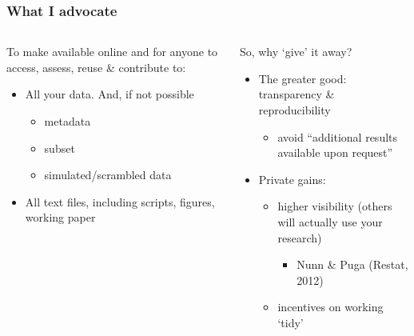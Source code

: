 \documentclass[ignorenonframetext]{beamer}
\begin{document}
\begin{frame}
  \frametitle{What I advocate}
  \begin{columns}
    \begin{column}{.5\textwidth}
      To make available online and for anyone to \alert{access}, \alert{assess}, \alert{reuse} \& \alert{contribute} to:
      \begin{itemize}
        \item All your \alert{data}. And, if not possible
          \begin{itemize}
            \item metadata
            \item subset
            \item simulated/scrambled data
          \end{itemize}
        \item All \alert{text} files, including scripts, figures, working paper\pause
        \end{itemize}
    \end{column}

    \begin{column}{.5\textwidth}
      So, why `give' it away?
      \begin{itemize}
        \item The greater good: \alert{transparency} \& \alert{reproducibility}
          \begin{itemize}
            \item avoid ``additional results available upon request''
          \end{itemize}
        \item \alert{Private} gains:
          \begin{itemize}
            \item higher visibility (others will actually use your research)
              \begin{itemize}
                \item Nunn \& Puga (Restat, 2012)
              \end{itemize}
              \item incentives on working `tidy'
          \end{itemize}
      \end{itemize}
    \end{column}
  \end{columns}
\end{frame}
\end{document}
